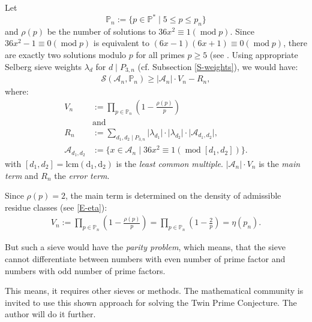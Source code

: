 \documentclass[fmeq,reqno]{amsart}
\theoremstyle{definition}
\theoremstyle{remark}
\numberwithin{equation}{section}
\newcommand{\p}{\mathbb{P}}
\newcommand{\M}[1]{\mathbb{#1}}
\newcommand{\mc}[1]{\mathcal{#1}}
\newcommand{\sieb}{\mathcal{S}}
\newcommand{\mood}[1]{(\operatorname{mod} #1)}
\newcommand{\opn}[1]{\operatorname{#1}}
\newcommand{\abs}[1]{\lvert#1\rvert}
\newcommand{\set}[1]{\lbrace #1\rbrace}
\begin{document}
Let
\[
\p_n := \set{ p \in \M{P}^* \mid 5 \leq p \leq p_n }
\]
and $\rho(p)$ be the number of solutions to $36x^2 \equiv 1 \mood{p}$. Since $36x^2 - 1 \equiv 0 \mood{p}$ is equivalent to $(6x - 1)(6x + 1) \equiv 0 \mood{p}$, there are exactly two solutions modulo $p$ for all primes $p \geq 5$ (see \cite[Theorem 7.3]{HardyWright}.
Using appropriate Selberg sieve weights $\lambda_d$ for $d \mid P_{3,n}$ (cf. Subsection \ref{S-weights}), we would have:
\begin{align}\label{E-sieveexpression}
\sieb(\mc{A}_n, \p_n) \geq \abs{\mc{A}_n} \cdot V_n - R_n,
\end{align}
where:
\begin{align*}
V_n &:= \prod_{p \in \p_n} \left(1 - \frac{\rho(p)}{p}\right)
\\
&\text{and}\\
R_n &:= \sum_{d_1, d_2 \mid P_{3,n}} \abs{\lambda_{d_1}} \cdot \abs{\lambda_{d_2}} \cdot \abs{\mc{A}_{d_1, d_2}}, \\ 
\mc{A}_{d_1, d_2} &:= \set{ x \in \mc{A}_n \mid 36x^2 \equiv 1 \mood{[d_1, d_2]} }.
\end{align*}
with $[d_1, d_2]=\opn{lcm(d_1,d_2)}$ is the \emph{least common multiple}.
$\abs{\mc{A}_n}\cdot V_n$ is the \emph{main term} and $R_n$ the \emph{error term}.

Since $\rho(p) = 2$, the main term is determined on the density of admissible residue classes (see \eqref{E-eta}):
\begin{align*}
V_n := \prod_{p \in \p_n} \left(1 - \frac{\rho(p)}{p}\right) = \prod_{p \in \p_n} \left(1 - \frac{2}{p}\right) = \eta(p_n).
\end{align*}

But such a sieve would have the \emph{parity problem}, which means, that the sieve cannot differentiate between numbers with even number of prime factor and numbers with odd number of prime factors. 
\medskip

This means, it requires other sieves or methods. The mathematical community is invited to use this shown approach for solving the Twin Prime Conjecture. The author will do it further.

\end{document}

